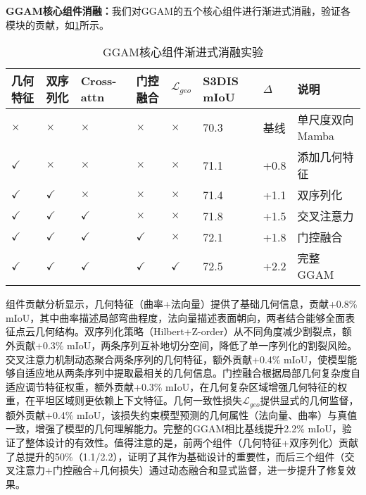 \documentclass[preprint,12pt]{elsarticle}
\begin{document}

\textbf{GGAM核心组件消融：}我们对GGAM的五个核心组件进行渐进式消融，验证各模块的贡献，如\cref{tab:ggam_full_ablation}所示。

\begin{table}[htbp!]
	\centering
	\caption{GGAM核心组件渐进式消融实验}
	\label{tab:ggam_full_ablation}
	\begin{tabular}{@{}llllllll@{}}
		\toprule
		几何特征 & 双序列化 & Cross-attn & 门控融合 & $\mathcal{L}_{geo}$ & S3DIS mIoU & $\Delta$ & 说明 \\ 
		\midrule
		$\times$ & $\times$ & $\times$ & $\times$ & $\times$ & 70.3 & 基线 & 单尺度双向Mamba \\
		\midrule
		$\checkmark$ & $\times$ & $\times$ & $\times$ & $\times$ & 71.1 & +0.8 & 添加几何特征 \\
		$\checkmark$ & $\checkmark$ & $\times$ & $\times$ & $\times$ & 71.4 & +1.1 & 双序列化 \\
		$\checkmark$ & $\checkmark$ & $\checkmark$ & $\times$ & $\times$ & 71.8 & +1.5 & 交叉注意力 \\
		$\checkmark$ & $\checkmark$ & $\checkmark$ & $\checkmark$ & $\times$ & 72.1 & +1.8 & 门控融合 \\
		$\checkmark$ & $\checkmark$ & $\checkmark$ & $\checkmark$ & $\checkmark$ & 72.5 & +2.2 & 完整GGAM \\
		\bottomrule
	\end{tabular}
\end{table}

组件贡献分析显示，几何特征（曲率+法向量）提供了基础几何信息，贡献+0.8\% mIoU，其中曲率描述局部弯曲程度，法向量描述表面朝向，两者结合能够全面表征点云几何结构。双序列化策略（Hilbert+Z-order）从不同角度减少割裂点，额外贡献+0.3\% mIoU，两条序列互补地切分空间，降低了单一序列化的割裂风险。交叉注意力机制动态聚合两条序列的几何特征，额外贡献+0.4\% mIoU，使模型能够自适应地从两条序列中提取最相关的几何信息。门控融合根据局部几何复杂度自适应调节特征权重，额外贡献+0.3\% mIoU，在几何复杂区域增强几何特征的权重，在平坦区域则更依赖上下文特征。几何一致性损失$\mathcal{L}_{geo}$提供显式的几何监督，额外贡献+0.4\% mIoU，该损失约束模型预测的几何属性（法向量、曲率）与真值一致，增强了模型的几何理解能力。完整的GGAM相比基线提升2.2\% mIoU，验证了整体设计的有效性。值得注意的是，前两个组件（几何特征+双序列化）贡献了总提升的50\%（1.1/2.2），证明了其作为基础设计的重要性，而后三个组件（交叉注意力+门控融合+几何损失）通过动态融合和显式监督，进一步提升了修复效果。
\end{document}

